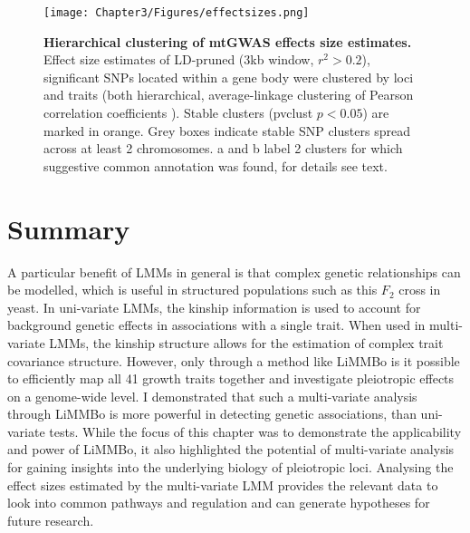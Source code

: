 \begin{figure}[hbtp]
	\centering
	\texttt{[image: Chapter3/Figures/effectsizes.png]}
	\caption[\textbf{Hierarchical clustering of mtGWAS effects size estimates.}]{\textbf{Hierarchical clustering of mtGWAS effects size estimates.} Effect size estimates of LD-pruned (\num{3}kb window, \(r^2 > 0.2\)), significant SNPs located within a gene body were clustered by loci and traits (both hierarchical, average-linkage clustering of Pearson correlation coefficients ). Stable clusters (pvclust \( p < 0.05\)) are marked in orange. Grey boxes indicate stable SNP clusters spread across at least \num{2} chromosomes. a and b label \num{2} clusters for which suggestive common annotation was found, for details see text.}
 	\label{fig:effectsizes}
\end{figure}

\section{Summary}
A particular benefit of LMMs in general is that complex genetic relationships can be modelled, which is useful in structured populations such as this \(F_2\) cross in yeast. In uni-variate LMMs, the kinship information is used to account for background genetic effects in associations with a single trait. When used in multi-variate LMMs, the kinship structure allows for the estimation of complex trait covariance structure. However, only through a method like LiMMBo is it possible to efficiently map all \num{41} growth traits together and investigate pleiotropic effects on a genome-wide level. I demonstrated that such a multi-variate analysis through LiMMBo is more powerful in detecting genetic associations, than uni-variate tests. While the focus of this chapter was to demonstrate the applicability and power of  LiMMBo, it also highlighted the potential of multi-variate analysis for gaining insights into the underlying biology of pleiotropic loci. Analysing the effect sizes estimated by the multi-variate LMM provides the relevant data to look into common pathways and regulation and can generate hypotheses for future research.
